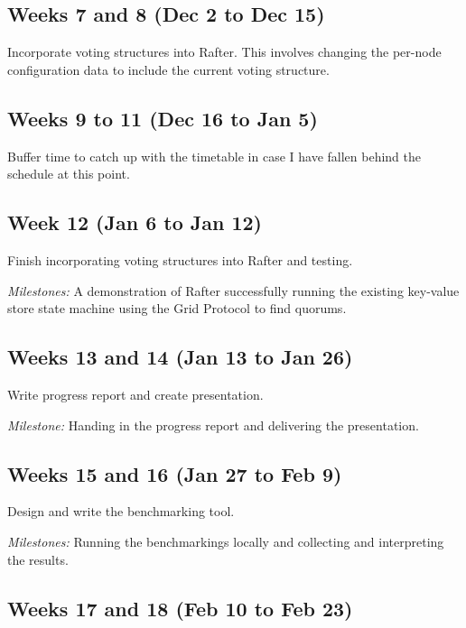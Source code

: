 \documentclass[12pt,chapterprefix=true,toc=bibliography,numbers=noendperiod,
               footnotes=multiple,twoside]{scrreprt}
\begin{document}
\subsection*{Weeks 7 and 8 (Dec 2 to Dec 15)%
  \label{weeks-7-and-8-dec-2-to-dec-15}%
}

Incorporate voting structures into Rafter. This involves changing the per-node configuration data to include the current voting structure.

\subsection*{Weeks 9 to 11 (Dec 16 to Jan 5)%
  \label{weeks-9-to-11-dec-16-to-jan-5}%
}
Buffer time to catch up with the timetable in case I have fallen behind the schedule at this point.

\subsection*{Week 12 (Jan 6 to Jan 12)%
  \label{week-12-jan-6-to-jan-12}%
}

Finish incorporating voting structures into Rafter and testing.

\emph{Milestones:} A demonstration of Rafter successfully running the existing key-value store state machine using the Grid Protocol to find quorums.

\subsection*{Weeks 13 and 14 (Jan 13 to Jan 26)%
  \label{weeks-13-and-14-jan-13-to-jan-26}%
}

Write progress report and create presentation.

\emph{Milestone:} Handing in the progress report and delivering the presentation.

\subsection*{Weeks 15 and 16 (Jan 27 to Feb 9)%
  \label{weeks-15-and-16-jan-27-to-feb-9}%
}

Design and write the benchmarking tool.

\emph{Milestones:} Running the benchmarkings locally and collecting and interpreting the results.

\subsection*{Weeks 17 and 18 (Feb 10 to Feb 23)%
  \label{weeks-17-and-18-feb-10-to-feb-23}%
}
\end{document}
